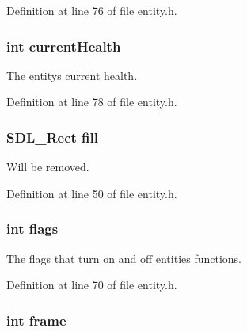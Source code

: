 Definition at line 76 of file entity.\+h.

\hypertarget{structentity__s_af8c04013cfb0444c405822e9939d8ae6}{}
\subsubsection[{current\+Health}]{\setlength{\rightskip}{0pt plus 5cm}int current\+Health}\label{structentity__s_af8c04013cfb0444c405822e9939d8ae6}


The entity\textquotesingle{}s current health. 



Definition at line 78 of file entity.\+h.

\hypertarget{structentity__s_a5de6327fc6879218213f1741891b8c52}{}
\subsubsection[{fill}]{\setlength{\rightskip}{0pt plus 5cm}S\+D\+L\+\_\+\+Rect fill}\label{structentity__s_a5de6327fc6879218213f1741891b8c52}


Will be removed. 



Definition at line 50 of file entity.\+h.

\hypertarget{structentity__s_ac8bf36fe0577cba66bccda3a6f7e80a4}{}
\subsubsection[{flags}]{\setlength{\rightskip}{0pt plus 5cm}int flags}\label{structentity__s_ac8bf36fe0577cba66bccda3a6f7e80a4}


The flags that turn on and off entities\textquotesingle{} functions. 



Definition at line 70 of file entity.\+h.

\hypertarget{structentity__s_ad30f972f2e6e3e5ecab0dee38ae6cdb8}{}
\subsubsection[{frame}]{\setlength{\rightskip}{0pt plus 5cm}int frame}\label{structentity__s_ad30f972f2e6e3e5ecab0dee38ae6cdb8}



